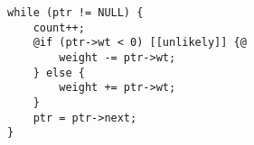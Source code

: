 \begin{lstlisting}[style=CStyle]
while (ptr != NULL) {
    count++;
    @if (ptr->wt < 0) [[unlikely]] {@
        weight -= ptr->wt;
    } else {
        weight += ptr->wt;
    }
    ptr = ptr->next;
}

\end{lstlisting}